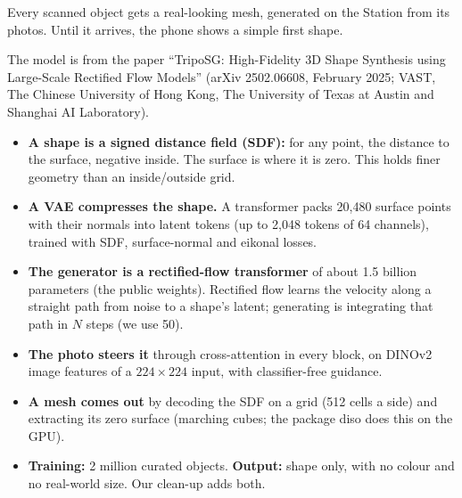 \documentclass[10pt]{article}
\newcommand{\Sub}[1]{\Needspace{18mm}\vspace{2.5mm}\noindent{\bfseries\color{accD}#1}\par\vspace{0.3mm}}
\newcommand{\code}[1]{{\ttfamily\fontsize{8.8}{11}\selectfont #1}}
\begin{document}
Every scanned object gets a real-looking mesh, generated on the Station from its photos. Until it arrives, the phone shows a simple first shape.

\Sub{How TripoSG works}

The model is from the paper ``TripoSG: High-Fidelity 3D Shape Synthesis using Large-Scale Rectified Flow Models'' (arXiv 2502.06608, February 2025; VAST, The Chinese University of Hong Kong, The University of Texas at Austin and Shanghai AI Laboratory).

\begin{itemize}
\item \textbf{A shape is a signed distance field (SDF):} for any point, the distance to the surface, negative inside. The surface is where it is zero. This holds finer geometry than an inside/outside grid.
\item \textbf{A VAE compresses the shape.} A transformer packs 20,480 surface points with their normals into latent tokens (up to 2,048 tokens of 64 channels), trained with SDF, surface-normal and eikonal losses.
\item \textbf{The generator is a rectified-flow transformer} of about 1.5 billion parameters (the public weights). Rectified flow learns the velocity along a straight path from noise to a shape's latent; generating is integrating that path in $N$ steps (we use 50).
\item \textbf{The photo steers it} through cross-attention in every block, on DINOv2 image features of a $224\times224$ input, with classifier-free guidance.
\item \textbf{A mesh comes out} by decoding the SDF on a grid (512 cells a side) and extracting its zero surface (marching cubes; the package \code{diso} does this on the GPU).
\item \textbf{Training:} 2 million curated objects. \textbf{Output:} shape only, with no colour and no real-world size. Our clean-up adds both.
\end{itemize}

\Sub{Our pipeline}
\end{document}
